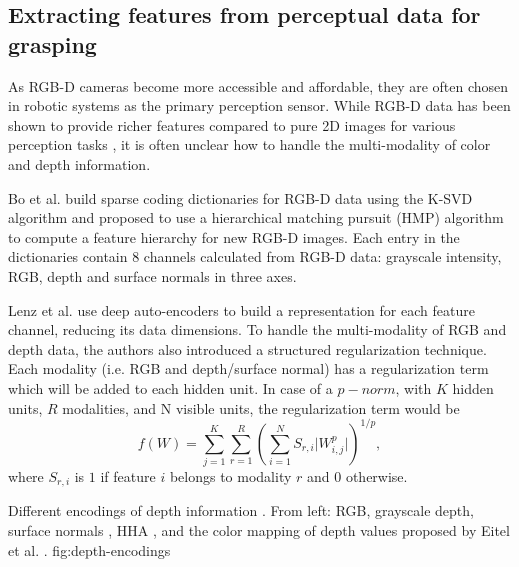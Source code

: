 \subsection{Extracting features from perceptual data for grasping}
As RGB-D cameras become more accessible and affordable, they are often chosen in robotic systems as the primary
perception sensor. While RGB-D data has been shown to provide richer features compared to pure 2D images for various
perception tasks \cite{lenz2015,Eitel2015,Gupta2014RGBDFeatures,jiang2011}, it is often unclear how to handle the
multi-modality of color and depth information.

Bo et al. \cite{Bo2013} build sparse coding dictionaries for RGB-D data using the K-SVD algorithm and proposed to use
a hierarchical matching pursuit (HMP)  algorithm to compute a feature hierarchy for new RGB-D images. Each entry in the
dictionaries contain 8 channels calculated from RGB-D data: grayscale intensity, RGB, depth and surface normals in three
axes.

Lenz et al. \cite{lenz2015} use deep auto-encoders to build a representation for each feature channel, reducing its data
dimensions. To handle the multi-modality of RGB and depth data, the authors also introduced a structured regularization
technique. Each modality (i.e. RGB and depth/surface normal) has a regularization term which will be added to each
hidden unit. In case of a $p-norm$, with $K$ hidden units, $R$ modalities, and N visible units, the regularization term
would be
\[f(W) = \sum\limits^K_{j=1} \sum\limits^R_{r=1} \left( \sum\limits^N_{i=1} S_{r,i} \lvert W^p_{i,j} \rvert \right)
^{1/p}, \]
where $S_{r,i}$ is $1$ if feature $i$ belongs to modality $r$ and $0$ otherwise.

             {Different encodings of depth information \cite{Eitel2015}. From left: RGB, grayscale depth, surface
              normals \cite{Bo2013}, HHA \cite{Gupta2014RGBDFeatures}, and the color mapping of depth values proposed
              by Eitel et al. \cite{Eitel2015}.}
             {fig:depth-encodings}{\linewidth}

